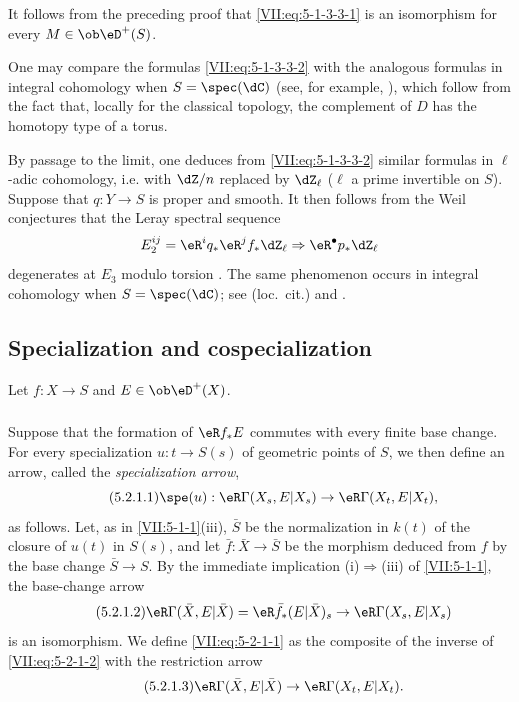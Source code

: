 \documentclass[oneside]{book}
\begin{document}
It follows from the preceding proof that \eqref{VII:eq:5-1-3-3-1} is an
isomorphism for every $M\in\ob\eD^+(S)$.

One may compare the formulas \eqref{VII:eq:5-1-3-3-2} with the analogous
formulas in integral cohomology when $S=\spec(\dC)$ (see, for example,
\cite[3.1]{de71-2}), which follow from the fact that, locally for the classical
topology, the complement of $D$ has the homotopy type of a torus.

By passage to the limit, one deduces from \eqref{VII:eq:5-1-3-3-2} similar
formulas in $\ell$-adic cohomology, i.e. with $\dZ/n$ replaced by $\dZ_\ell$
($\ell$ a prime invertible on $S$). Suppose that $q:Y\to S$ is proper and
smooth. It then follows from the Weil conjectures \cite{de74,de80} that the
Leray spectral sequence
\[
  E_2^{i j} = \eR^i q_\ast \eR^j f_\ast \dZ_\ell \Rightarrow \eR^\bullet p_\ast \dZ_\ell 
\]
degenerates at $E_3$ modulo torsion \cite[\S 6]{de71-1}. The same phenomenon
occurs in integral cohomology when $S=\spec(\dC)$; see (loc.\ cit.) and
\cite[3.2.13]{de71-2}.





\subsection{Specialization and cospecialization}\label{VII:5-2}

Let $f:X\to S$ and $E\in\ob\eD^+(X)$.






\subsubsection{}\label{VII:5-2-1}

Suppose that the formation of $\eR f_\ast E$ commutes with every finite base
change. For every specialization $u:t\to S(s)$ of geometric points of $S$,
we then define an arrow, called the \emph{specialization arrow},
\begin{equation*}\tag{5.2.1.1}\label{VII:eq:5-2-1-1}
  \spe(u):\eR\Gamma(X_s,E|X_s) \to \eR\Gamma(X_t,E|X_t) \text{,}
\end{equation*}
as follows. Let, as in \ref{VII:5-1-1}(iii), $\bar S$ be the normalization in
$k(t)$ of the closure of $u(t)$ in $S(s)$, and let
$\bar f:\bar X\to \bar S$ be the morphism deduced from $f$ by the base change
$\bar S\to S$. By the immediate implication (i)$\Rightarrow$(iii) of
\ref{VII:5-1-1}, the base-change arrow
\begin{equation*}\tag{5.2.1.2}\label{VII:eq:5-2-1-2}
  \eR\Gamma(\bar X,E|\bar X)=\eR\bar f_\ast (E|\bar X)_s \to \eR\Gamma(X_s,E|X_s) 
\end{equation*}
is an isomorphism. We define \eqref{VII:eq:5-2-1-1} as the composite of the
inverse of \eqref{VII:eq:5-2-1-2} with the restriction arrow
\begin{equation*}\tag{5.2.1.3}\label{VII:eq:5-2-1-3}
  \eR\Gamma(\bar X,E|\bar X) \to \eR\Gamma(X_t,E|X_t) \text{.}
\end{equation*}
\end{document}
